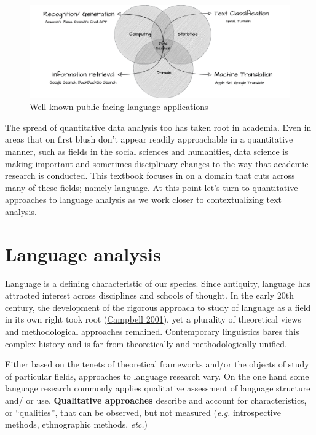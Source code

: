 \documentclass[
  letterpaper,
  DIV=11,
  numbers=noendperiod]{scrreport}
\theoremstyle{definition}
\theoremstyle{remark}
\begin{document}
\begin{figure}[H]

{\centering \includegraphics[width=1\textwidth,height=\textheight]{figures/ta-lang-venn.drawio.png}

}

\caption{\label{fig-intro-language-applications}Well-known public-facing
language applications}

\end{figure}

The spread of quantitative data analysis too has taken root in academia.
Even in areas that on first blush don't appear readily approachable in a
quantitative manner, such as fields in the social sciences and
humanities, data science is making important and sometimes disciplinary
changes to the way that academic research is conducted. This textbook
focuses in on a domain that cuts across many of these fields; namely
language. At this point let's turn to quantitative approaches to
language analysis as we work closer to contextualizing text analysis.

\hypertarget{language-analysis}{%
\section{Language analysis}\label{language-analysis}}

Language is a defining characteristic of our species. Since antiquity,
language has attracted interest across disciplines and schools of
thought. In the early 20th century, the development of the rigorous
approach to study of language as a field in its own right took root
(\protect\hyperlink{ref-Campbell2001}{Campbell 2001}), yet a plurality
of theoretical views and methodological approaches remained.
Contemporary linguistics bares this complex history and is far from
theoretically and methodologically unified.

Either based on the tenets of theoretical frameworks and/or the objects
of study of particular fields, approaches to language research vary. On
the one hand some language research commonly applies qualitative
assessment of language structure and/ or use. \textbf{Qualitative
approaches} describe and account for characteristics, or ``qualities'',
that can be observed, but not measured (\emph{e.g.} introspective
methods, ethnographic methods, \emph{etc.})
\end{document}
